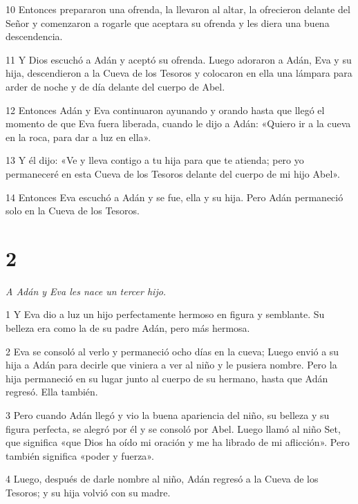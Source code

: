\par 10 Entonces prepararon una ofrenda, la llevaron al altar, la ofrecieron delante del Señor y comenzaron a rogarle que aceptara su ofrenda y les diera una buena descendencia.

\par 11 Y Dios escuchó a Adán y aceptó su ofrenda. Luego adoraron a Adán, Eva y su hija, descendieron a la Cueva de los Tesoros y colocaron en ella una lámpara para arder de noche y de día delante del cuerpo de Abel.

\par 12 Entonces Adán y Eva continuaron ayunando y orando hasta que llegó el momento de que Eva fuera liberada, cuando le dijo a Adán: «Quiero ir a la cueva en la roca, para dar a luz en ella».

\par 13 Y él dijo: «Ve y lleva contigo a tu hija para que te atienda; pero yo permaneceré en esta Cueva de los Tesoros delante del cuerpo de mi hijo Abel».

\par 14 Entonces Eva escuchó a Adán y se fue, ella y su hija. Pero Adán permaneció solo en la Cueva de los Tesoros.

\chapter{2}

\par \textit{A Adán y Eva les nace un tercer hijo.}

\par 1 Y Eva dio a luz un hijo perfectamente hermoso en figura y semblante. Su belleza era como la de su padre Adán, pero más hermosa.

\par 2 Eva se consoló al verlo y permaneció ocho días en la cueva; Luego envió a su hija a Adán para decirle que viniera a ver al niño y le pusiera nombre. Pero la hija permaneció en su lugar junto al cuerpo de su hermano, hasta que Adán regresó. Ella también.

\par 3 Pero cuando Adán llegó y vio la buena apariencia del niño, su belleza y su figura perfecta, se alegró por él y se consoló por Abel. Luego llamó al niño Set, que significa «que Dios ha oído mi oración y me ha librado de mi aflicción». Pero también significa «poder y fuerza».

\par 4 Luego, después de darle nombre al niño, Adán regresó a la Cueva de los Tesoros; y su hija volvió con su madre.

